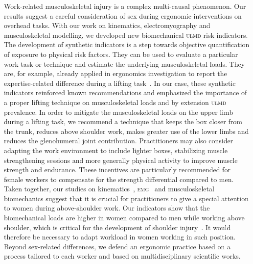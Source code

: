 Work-related musculoskeletal injury is a complex multi-causal phenomenon.
Our results suggest a careful consideration of sex during ergonomic interventions on overhead tasks.
With our work on kinematics, electromyography and musculoskeletal modelling, we developed new biomechanical \textsc{ulmd} risk indicators.
The development of synthetic indicators is a step towards objective quantification of exposure to physical risk factors.
They can be used to evaluate a particular work task or technique and estimate the underlying musculoskeletal loads.
They are, for example, already applied in ergonomics investigation to report the expertise-related difference during a lifting task~\cite{goubault-evsn}.
In our case, these synthetic indicators reinforced known recommendations and emphasized the importance of a proper lifting technique on musculoskeletal loads and by extension \textsc{ulmd} prevalence.
In order to mitigate the musculoskeletal loads on the upper limb during a lifting task, we recommend a technique that keeps the box closer from the trunk, reduces above shoulder work, makes greater use of the lower limbs and reduces the glenohumeral joint contribution.
Practitioners may also consider adapting the work environment to include lighter boxes, stabilizing muscle strengthening sessions and more generally physical activity to improve muscle strength and endurance.
These incentives are particularly recommended for female workers to compensate for the strength differential compared to men.
Taken together, our studies on kinematics~\citep{Martinez2019-mm}, \textsc{emg}~\citep{Bouffard2019-fd} and musculoskeletal biomechanics suggest that it is crucial for practitioners to give a special attention to women during above-shoulder work.
Our indicators show that the biomechanical loads are higher in women compared to men while working above shoulder, which is critical for the development of shoulder injury~\citep{Van_der_Molen2017-sb}.
It would therefore be necessary to adapt workload in women working in such position.
Beyond sex-related differences, we defend an ergonomic practice based on a process tailored to each worker and based on multidisciplinary scientific works.